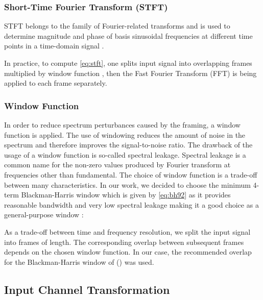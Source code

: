 \documentclass[a4paper,conference]{IEEEtran}
\begin{document}
\subsubsection{Short-Time Fourier Transform (STFT)}
STFT belongs to the family of Fourier-related transforms and is used to determine magnitude and phase of basis sinusoidal frequencies  at different time points  in a time-domain signal .



In practice, to compute \autoref{eq:stft}, one splits input signal into overlapping frames multiplied by window function , then the Fast Fourier Transform (FFT) \cite{cooley1965fft} is being applied to each frame separately.

\subsubsection{Window Function}
In order to reduce spectrum perturbances caused by the framing, a window function is applied.
The use of windowing reduces the amount of noise in the spectrum and therefore improves the signal-to-noise ratio.
The drawback of the usage of a window function is so-called spectral leakage.
Spectral leakage is a common name for the non-zero values produced by Fourier transform at frequencies other than fundamental.
The choice of window function is a trade-off between many characteristics.
In our work, we decided to choose the minimum \mbox{4-term} \mbox{Blackman-Harris} window \cite{harris1978window} which is given by \autoref{eq:bh92} as it provides reasonable bandwidth and very low spectral leakage making it a good choice as a \mbox{general-purpose} window \cite{heinzel2002spectrum}:



\begin{center}
    
\end{center}

As a trade-off between time and frequency resolution, we split the input signal into frames of  length.
The corresponding overlap between subsequent frames depends on the chosen window function.
In our case, the recommended overlap for the \mbox{Blackman-Harris} window of  () \cite{heinzel2002spectrum} was used.

\subsection{Input Channel Transformation} \label{ssec:align}
\end{document}
